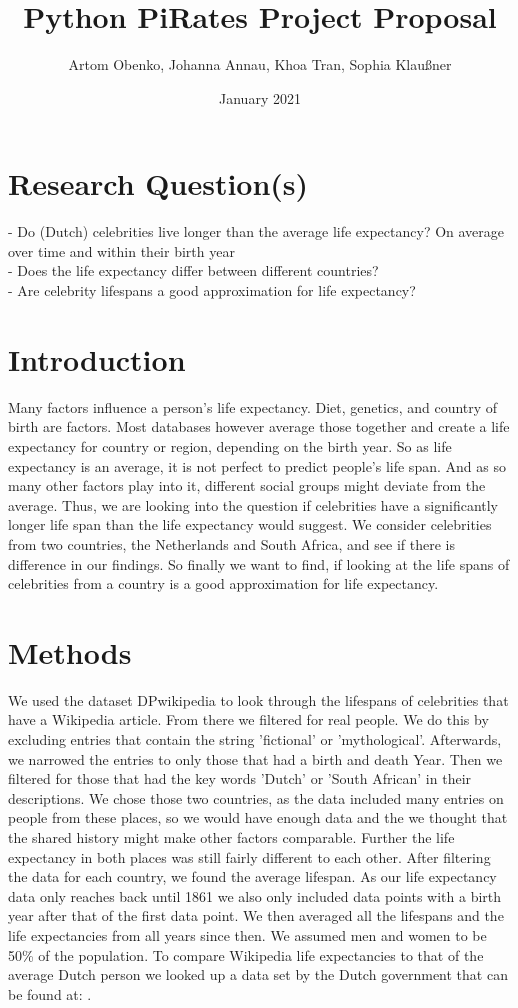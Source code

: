 \documentclass{article}
\title{Python PiRates Project Proposal}
\author{Artom Obenko, Johanna Annau, Khoa Tran, Sophia Klaußner}
\date{January 2021}
\begin{document}
	
\maketitle
	
\section{Research Question(s)}
- Do (Dutch) celebrities live longer than the average life expectancy? On average over time and within their birth year\\
- Does the life expectancy differ between different countries?\\
- Are celebrity lifespans a good approximation for life expectancy?\\
	
\section{Introduction}
Many factors influence a person's life expectancy. Diet, genetics, and country of birth are factors. Most databases however average those together and create a life expectancy for country or region, depending on the birth year.
So as life expectancy is an average, it is not perfect to predict people's life span. And as so many other factors play into it, different social groups might deviate from the average. Thus, we are looking into the question if celebrities have a significantly longer life span than the life expectancy would suggest. We consider celebrities from two countries, the Netherlands and South Africa, and see if there is difference in our findings. So finally we want to find, if looking at the life spans of celebrities from a country is a good approximation for life expectancy.

\section{Methods}
We used the dataset DPwikipedia to look through the lifespans of celebrities that have a Wikipedia article. From there we filtered for real people. We do this by excluding entries that contain the string 'fictional' or 'mythological'. Afterwards, we narrowed the entries to only those that had a birth and death Year. Then we filtered for those that had the key words 'Dutch' or 'South African' in their descriptions. We chose those two countries, as the data included many entries on people from these places, so we would have enough data and the we thought that the shared history might make other factors comparable. Further the life expectancy in both places was still fairly different to each other. After filtering the data for each country, we found the average lifespan. As our life expectancy data only reaches back until 1861 we also only included data points with a birth year after that of the first data point. We then averaged all the lifespans and the life expectancies from all years since then. We assumed men and women to be 50\% of the population. To compare Wikipedia life expectancies to that of the average Dutch person we looked up a data set by the Dutch government that can be found at: \cite{Levensverwachting}. 
\end{document}
